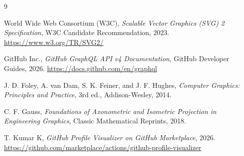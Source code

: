 \documentclass[12pt,a4paper]{report}
\begin{document}
\cleardoublepage
\begin{thebibliography}{9}

World Wide Web Consortium (W3C), \textit{Scalable Vector Graphics (SVG) 2 Specification}, W3C Candidate Recommendation, 2023. \url{https://www.w3.org/TR/SVG2/}

GitHub Inc., \textit{GitHub GraphQL API v4 Documentation}, GitHub Developer Guides, 2026. \url{https://docs.github.com/en/graphql}

J. D. Foley, A. van Dam, S. K. Feiner, and J. F. Hughes, \textit{Computer Graphics: Principles and Practice}, 3rd ed., Addison-Wesley, 2014.

C. F. Gauss, \textit{Foundations of Axonometric and Isometric Projection in Engineering Graphics}, Classic Mathematical Reprints, 2018.

T. Kumar K, \textit{GitHub Profile Visualizer on GitHub Marketplace}, 2026. \url{https://github.com/marketplace/actions/github-profile-visualizer}

\end{thebibliography}
\end{document}
